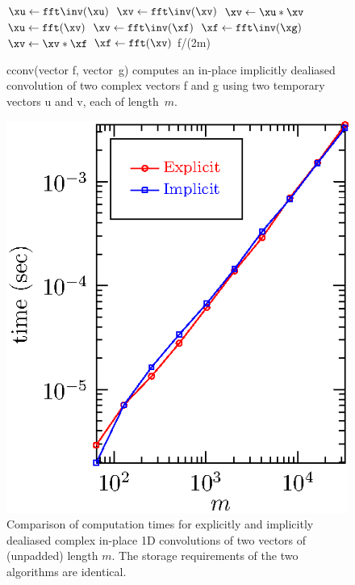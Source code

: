 \documentclass[final]{siamltex}
\begin{document}
\begin{figure}[htbp]
\begin{minipage}{0.5\linewidth}
\begin{function}[H]
  \medskip
  $\xu \leftarrow \fft\inv(\xu)$\;
  $\xv \leftarrow \fft\inv(\xv)$\;
  $\xv \leftarrow \xu * \xv$\;
  $\xu \leftarrow \fft(\xv)$\;
  \medskip
  $\xv \leftarrow \fft\inv(\xf)$\;
  $\xf \leftarrow \fft\inv(\xg)$\;
  $\xv \leftarrow \xv * \xf$\;
  $\xf \leftarrow \fft(\xv)$\;
  \medskip
  \Return f/(2m)\;
\caption{cconv(vector {\sf f}, vector~{\sf g}) computes
an in-place implicitly dealiased convolution of two complex vectors {\sf f}
and {\sf g} using two temporary vectors {\sf u} and {\sf v}, each of
length~$m$.}\label{cconv}
\end{function}
\end{minipage}
\begin{minipage}{0.5\linewidth}
\begin{center}
\includegraphics{timing1c}
\caption{Comparison of computation times for explicitly and implicitly
dealiased complex in-place 1D convolutions of two vectors of
(unpadded) length $m$. The storage requirements of the two algorithms are
identical.}
\label{timing1c}
\end{center}
\end{minipage}
\end{figure}
\end{document}
